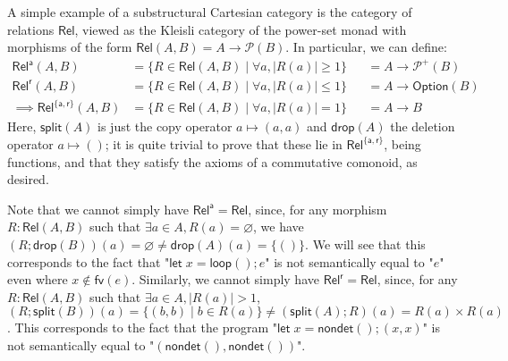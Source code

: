 \documentclass[acmsmall,screen,review]{acmart}
\newcommand{\mc}[1]{\ensuremath{\mathcal{#1}}}
\newcommand{\ms}[1]{\ensuremath{\mathsf{#1}}}
\begin{document}
A simple example of a substructural Cartesian category is the category of
relations \(\ms{Rel}\), viewed as the Kleisli category of the power-set monad
with morphisms of the form \(\ms{Rel}(A, B) = A \to \mc{P}(B)\). In particular,
we can define:
\begin{equation}
  \begin{aligned}
    \ms{Rel}^{\ms{a}}(A, B) 
    &= \{R \in \ms{Rel}(A, B) \mid \forall a, |R(a)| \geq 1\} 
    &&= A \to \mc{P}^+(B) \\
    \ms{Rel}^{\ms{r}}(A, B) 
    &= \{R \in \ms{Rel}(A, B) \mid \forall a, |R(a)| \leq 1\} 
    &&= A \to \ms{Option}(B) \\
    \implies \ms{Rel}^{\{\ms{a}, \ms{r}\}}(A, B) 
    &= \{R \in \ms{Rel}(A, B) \mid \forall a, |R(a)| = 1\} 
    &&= A \to B
  \end{aligned}
\end{equation}
Here, \(\ms{split}(A)\) is just the copy operator \(a \mapsto (a, a)\) and
\(\ms{drop}(A)\) the deletion operator \(a \mapsto ()\); it is quite trivial to
prove that these lie in \(\ms{Rel}^{\{\ms{a}, \ms{r}\}}\), being functions, and
that they satisfy the axioms of a commutative comonoid, as desired. 

Note that we cannot simply have \(\ms{Rel}^{\ms{a}} = \ms{Rel}\), since, for any
morphism \(R: \ms{Rel}(A, B)\) such that \(\exists a \in A, R(a) =
\varnothing\), we have \((R;\ms{drop}(B))(a) = \varnothing \neq \ms{drop}(A)(a)
= \{()\} \). We will see that this corresponds to the fact that "\(\ms{let}\;x =
\ms{loop}(); e\)" is not semantically equal to "\(e\)" even where \(x \notin
\ms{fv}(e)\). Similarly, we cannot simply have \(\ms{Rel}^{\ms{r}} = \ms{Rel}\),
since, for any \(R: \ms{Rel}(A, B)\) such that \(\exists a \in A, |R(a)| > 1\),
\(
  (R;\ms{split}(B))(a) = \{(b, b) \mid b \in R(a)\} \neq (\ms{split}(A);R)(a) = R(a) \times R(a) 
\). This corresponds
to the fact that the program "\(\ms{let}\;x = \ms{nondet}(); (x, x)\)" is not
semantically equal to "\((\ms{nondet}(), \ms{nondet}())\)".

\end{document}

